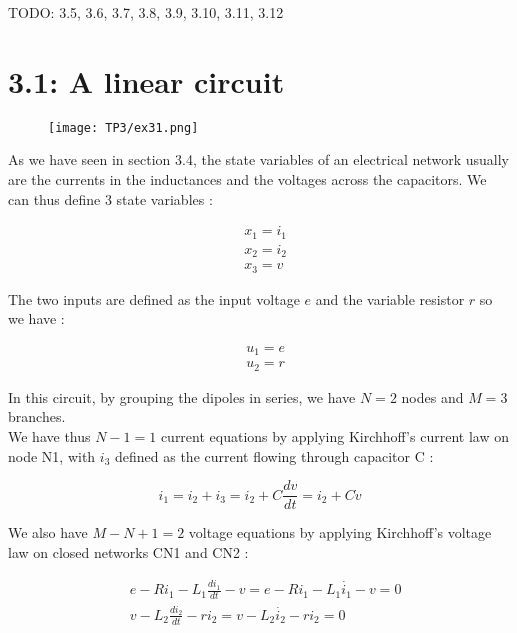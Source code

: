 TODO: 3.5, 3.6, 3.7, 3.8, 3.9, 3.10, 3.11, 3.12


\section*{3.1: A linear circuit}

\begin{figure}[htbp]
\begin{center}
\texttt{[image: TP3/ex31.png]}
\end{center}
\end{figure}

As we have seen in section 3.4, the state variables of an electrical network usually are the currents in the inductances and the voltages across the capacitors. We can thus define 3 state variables :

\begin{equation}
\begin{split}
&x_1 = i_1\\
&x_2=i_2\\
&x_3=v
\end{split} 
\end{equation}

The two inputs are defined as the input voltage $e$ and the variable resistor $r$ so we have :

\begin{equation}
\begin{split}
&u_1 = e\\
&u_2=r
\end{split} 
\end{equation}


In this circuit, by grouping the dipoles in series, we have $N=2$ nodes and $M=3$ branches.\\

We have thus $N-1=1$ current equations by applying Kirchhoff's current law on node N1, with $i_3$ defined as the current flowing through capacitor C :

\begin{equation}
i_1 =i_2+i_3 =i_2 + C \frac{dv}{dt} = i_2 + C\dot{v}
\end{equation}




We also have $M-N+1=2$ voltage equations by applying Kirchhoff's voltage law on closed networks CN1 and CN2 :

\begin{equation}
\begin{split}
&e - Ri_1 - L_1 \frac{di_1}{dt}-v=e - Ri_1 - L_1 \dot{i_1}-v=0\\
&v-L_2 \frac{di_2}{dt} - ri_2 = v-L_2 \dot{i_2} - ri_2=0
\end{split} 
\end{equation}

